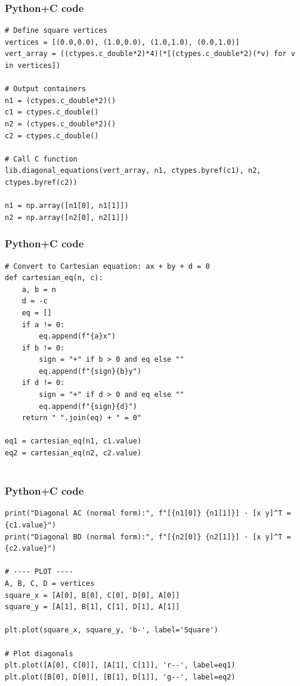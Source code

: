 \documentclass{beamer}
\begin{document}
\begin{frame}[fragile]
    \frametitle{Python+C code}

    \begin{lstlisting}
# Define square vertices
vertices = [(0.0,0.0), (1.0,0.0), (1.0,1.0), (0.0,1.0)]
vert_array = ((ctypes.c_double*2)*4)(*[(ctypes.c_double*2)(*v) for v in vertices])

# Output containers
n1 = (ctypes.c_double*2)()
c1 = ctypes.c_double()
n2 = (ctypes.c_double*2)()
c2 = ctypes.c_double()

# Call C function
lib.diagonal_equations(vert_array, n1, ctypes.byref(c1), n2, ctypes.byref(c2))

n1 = np.array([n1[0], n1[1]])
n2 = np.array([n2[0], n2[1]])

    \end{lstlisting}
\end{frame}

\begin{frame}[fragile]
    \frametitle{Python+C code}

    \begin{lstlisting}
# Convert to Cartesian equation: ax + by + d = 0
def cartesian_eq(n, c):
    a, b = n
    d = -c
    eq = []
    if a != 0:
        eq.append(f"{a}x")
    if b != 0:
        sign = "+" if b > 0 and eq else ""
        eq.append(f"{sign}{b}y")
    if d != 0:
        sign = "+" if d > 0 and eq else ""
        eq.append(f"{sign}{d}")
    return " ".join(eq) + " = 0"

eq1 = cartesian_eq(n1, c1.value)
eq2 = cartesian_eq(n2, c2.value)


    \end{lstlisting}
\end{frame}

\begin{frame}[fragile]
    \frametitle{Python+C code}

    \begin{lstlisting}
print("Diagonal AC (normal form):", f"[{n1[0]} {n1[1]}] · [x y]^T = {c1.value}")
print("Diagonal BD (normal form):", f"[{n2[0]} {n2[1]}] · [x y]^T = {c2.value}")

# ---- PLOT ----
A, B, C, D = vertices
square_x = [A[0], B[0], C[0], D[0], A[0]]
square_y = [A[1], B[1], C[1], D[1], A[1]]

plt.plot(square_x, square_y, 'b-', label='Square')

# Plot diagonals
plt.plot([A[0], C[0]], [A[1], C[1]], 'r--', label=eq1)
plt.plot([B[0], D[0]], [B[1], D[1]], 'g--', label=eq2)

    \end{lstlisting}
\end{frame}
\end{document}
